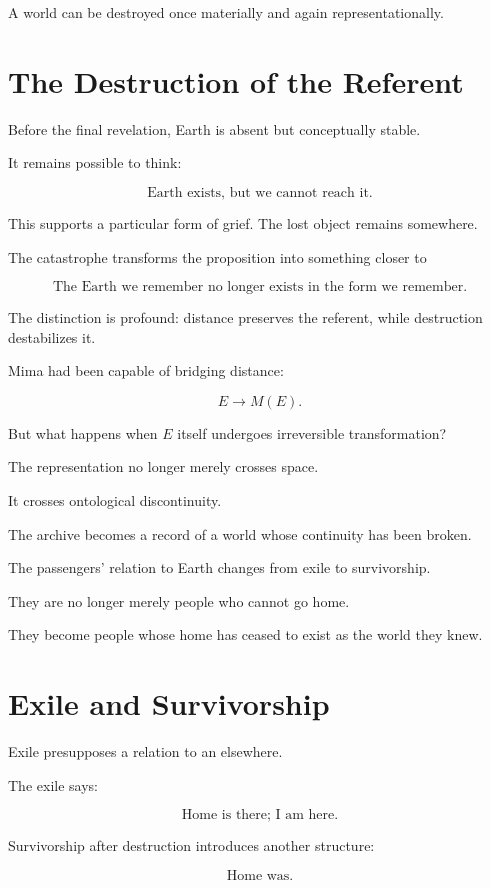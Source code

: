 \documentclass[11pt,oneside]{book}
\theoremstyle{definition}
\theoremstyle{remark}
\begin{document}
A world can be destroyed once materially and again representationally.

\section{The Destruction of the Referent}

Before the final revelation, Earth is absent but conceptually stable.

It remains possible to think:

\[
\text{Earth exists, but we cannot reach it.}
\]

This supports a particular form of grief. The lost object remains somewhere.

The catastrophe transforms the proposition into something closer to

\[
\text{The Earth we remember no longer exists in the form we remember.}
\]

The distinction is profound: distance preserves the referent, while destruction destabilizes it.

Mima had been capable of bridging distance:

\[
E
\longrightarrow
M(E).
\]

But what happens when \(E\) itself undergoes irreversible transformation?

The representation no longer merely crosses space.

It crosses ontological discontinuity.

The archive becomes a record of a world whose continuity has been broken.

The passengers' relation to Earth changes from exile to survivorship.

They are no longer merely people who cannot go home.

They become people whose home has ceased to exist as the world they knew.

\section{Exile and Survivorship}

Exile presupposes a relation to an elsewhere.

The exile says:

\[
\text{Home is there; I am here.}
\]

Survivorship after destruction introduces another structure:

\[
\text{Home was.}
\]
\end{document}
